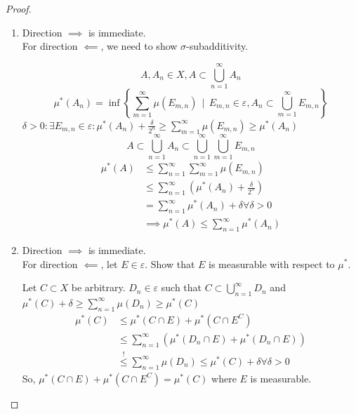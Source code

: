 \documentclass[a4paper]{article}
\numberwithin{lecref}{section}
\theoremstyle{break}
\newcommand{\SetDef}[2]{\left\{#1\,\mid\,#2\right\}}
\begin{document}
\begin{proof}
  \begin{enumerate}
    \item Direction $\implies$ is immediate. \\
      For direction $\impliedby$, we need to show $\sigma$-subadditivity.

      \[ A, A_n \in X, A \subset \bigcup_{n=1}^\infty A_n \]
      \[ \mu^*(A_n) = \inf\SetDef{\sum_{m=1}^\infty \mu(E_{m,n})}{E_{m,n} \in \varepsilon, A_n \subset \bigcup_{m=1}^\infty E_{m,n}} \]
      $\delta > 0: \exists E_{m,n} \in \varepsilon: \mu^*(A_n) + \frac{\delta}{2^n} \geq \sum_{m=1}^\infty \mu(E_{m,n}) \geq \mu^*(A_n)$
      \[ A \subset \bigcup_{n=1}^\infty A_n \subset \bigcup_{n=1}^\infty \bigcup_{m=1}^\infty E_{m,n} \]
      \begin{align*}
        \mu^*(A) &\leq \sum_{n=1}^\infty \sum_{m=1}^\infty \mu\left(E_{m,n}\right) \\
          &\leq \sum_{n=1}^\infty \left(\mu^*(A_n) + \frac{\delta}{2^n}\right) \\
          &= \sum_{n=1}^\infty \mu^*(A_n) + \delta \forall \delta > 0 \\
          &\implies \mu^*(A) \leq \sum_{n=1}^\infty \mu^*(A_n)
      \end{align*}
    \item Direction $\implies$ is immediate. \\
      For direction $\impliedby$, let $E \in \varepsilon$. Show that $E$ is measurable with respect to $\mu^*$.

      Let $C \subset X$ be arbitrary. $D_n \in \varepsilon$ such that $C \subset \bigcup_{n=1}^\infty D_n$ and $\mu^*(C) + \delta \geq \sum_{n=1}^\infty \mu(D_n) \geq \mu^*(C)$
      \begin{align*}
        \mu^*(C) &\leq \mu^*(C \cap E) + \mu^*(C \cap E^C) \\
          &\leq \sum_{n=1}^\infty \left(\mu^*(D_n \cap E) + \mu^*(D_n \cap E)\right) \\
          &\overset!\leq \sum_{n=1}^\infty \mu(D_n) \leq \mu^*(C) + \delta \forall \delta > 0
      \end{align*}
      So, $\mu^*(C \cap E) + \mu^*(C \cap E^C) = \mu^*(C)$ where $E$ is measurable.
  \end{enumerate}
\end{proof}
\end{document}
